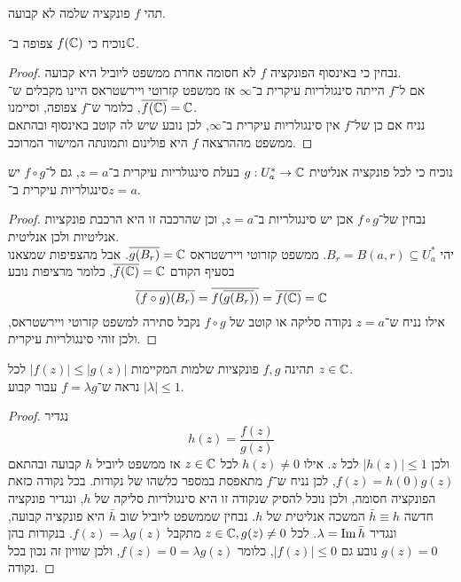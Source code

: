 \question{}
תהי $f$ פונקציה שלמה לא קבועה.

\subquestion{}
נוכיח כי $f(\mathbb{C})$ צפופה ב־$\mathbb{C}$.
\begin{proof}
	נבחין כי באינסוף הפונקציה $f$ לא חסומה אחרת ממשפט ליוביל היא קבועה. \\
	אם ל־$f$ הייתה סינגולריות עיקרית ב־$\infty$ אז ממשפט קזרוטי ויירשטראס היינו מקבלים ש־$\overline{f(\mathbb{C})} = \mathbb{C}$, כלומר ש־$f$ צפופה, וסיימנו. \\
	נניח אם כן של־$f$ אין סינגולריות עיקרית ב־$\infty$, לכן נובע שיש לה קוטב באינסוף ובהתאם ממשפט מההרצאה $f$ היא פולינום ותמונתה המישור המרוכב.
\end{proof}

\subquestion{}
נוכיח כי לכל פונקציה אנליטית $g : U_a^* \to \mathbb{C}$ בעלת סינגולריות עיקרית ב־$z = a$, גם ל־$f \circ g$ יש סינגולריות עיקרית ב־$z = a$.
\begin{proof}
	נבחין של־$f \circ g$ אכן יש סינגולריות ב־$z = a$, וכן שהרכבה זו היא הרכבת פונקציות אנליטיות ולכן אנליטית. \\
	יהי $B_r = B(a, r) \subseteq U_a^*$.
	ממשפט קזרוטי ויירשטראס $\overline{g(B_r)} = \mathbb{C}$.
	אבל מהצפיפות שמצאנו בסעיף הקודם $\overline{f(\mathbb{C})} = \mathbb{C}$, כלומר מרציפות נובע
	\[
		\overline{(f \circ g)(B_r)}
		= \overline{f(\overline{g(B_r)})}
		= \overline{f(\mathbb{C})} = \mathbb{C}
	\]
	אילו נניח ש־$z = a$ נקודה סליקה או קוטב של $f \circ g$ נקבל סתירה למשפט קזרוטי ויירשטראס, ולכן זוהי סינגולריות עיקרית.
\end{proof}

\question{}
תהינה $f, g$ פונקציות שלמות המקיימות $|f(z)| \le |g(z)|$ לכל $z \in \mathbb{C}$. \\
נראה ש־$f = \lambda g$ עבור קבוע $|\lambda| \le 1$.
\begin{proof}
	נגדיר
	\[
		h(z) = \frac{f(z)}{g(z)}
	\]
	ולכן $|h(z)| \le 1$ לכל $z$.
	אילו $h(z) \ne 0$ לכל $z \in \mathbb{C}$ אז ממשפט ליוביל $h$ קבועה ובהתאם $f(z) = h(0) g(z)$, לכן נניח ש־$f$ מתאפסת במספר כלשהו של נקודות.
	בכל נקודה כזאת הפונקציה חסומה, ולכן נוכל להסיק שנקודה זו היא סינגולריות סליקה של $h$, ונגדיר פונקציה חדשה $\bar{h} \equiv h$ המשכה אנליטית של $h$.
	נבחין שממשפט ליוביל שוב $\bar{h}$ היא פונקציה קבועה, ונגדיר $\lambda = \operatorname{Im} \bar{h}$.
	לכל $z \in \mathbb{C}, g(z) \ne 0$ מתקבל $f(z) = \lambda g(z)$.
	בנקודות בהן $g(z) = 0$ נובע גם $|f(z)| \le 0$, כלומר $f(z) = 0 = \lambda g(z)$, ולכן שוויון זה נכון בכל נקודה.
\end{proof}

